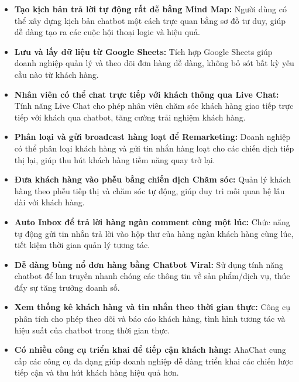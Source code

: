\begin{itemize}
    \item \textbf{Tạo kịch bản trả lời tự động rất dễ bằng Mind Map:} Người dùng có thể xây dựng kịch bản chatbot một cách trực quan bằng sơ đồ tư duy, giúp dễ dàng tạo ra các cuộc hội thoại logic và hiệu quả.


\item \textbf{Lưu và lấy dữ liệu từ Google Sheets:} Tích hợp Google Sheets giúp doanh nghiệp quản lý và theo dõi đơn hàng dễ dàng, không bỏ sót bất kỳ yêu cầu nào từ khách hàng.

\item \textbf{Nhân viên có thể chat trực tiếp với khách thông qua Live Chat:} Tính năng Live Chat cho phép nhân viên chăm sóc khách hàng giao tiếp trực tiếp với khách qua chatbot, tăng cường trải nghiệm khách hàng.

\item \textbf{Phân loại và gửi broadcast hàng loạt để Remarketing:} Doanh nghiệp có thể phân loại khách hàng và gửi tin nhắn hàng loạt cho các chiến dịch tiếp thị lại, giúp thu hút khách hàng tiềm năng quay trở lại.

\item \textbf{Đưa khách hàng vào phễu bằng chiến dịch Chăm sóc:} Quản lý khách hàng theo phễu tiếp thị và chăm sóc tự động, giúp duy trì mối quan hệ lâu dài với khách hàng.

\item \textbf{Auto Inbox để trả lời hàng ngàn comment cùng một lúc:} Chức năng tự động gửi tin nhắn trả lời vào hộp thư của hàng ngàn khách hàng cùng lúc, tiết kiệm thời gian quản lý tương tác.

\item \textbf{Dễ dàng bùng nổ đơn hàng bằng Chatbot Viral:} Sử dụng tính năng chatbot để lan truyền nhanh chóng các thông tin về sản phẩm/dịch vụ, thúc đẩy sự tăng trưởng doanh số.

\item \textbf{Xem thống kê khách hàng và tin nhắn theo thời gian thực:} Công cụ phân tích cho phép theo dõi và báo cáo khách hàng, tình hình tương tác và hiệu suất của chatbot trong thời gian thực.

\item \textbf{Có nhiều công cụ triển khai để tiếp cận khách hàng:} AhaChat cung cấp các công cụ đa dạng giúp doanh nghiệp dễ dàng triển khai các chiến lược tiếp cận và thu hút khách hàng hiệu quả hơn.
\end{itemize}

